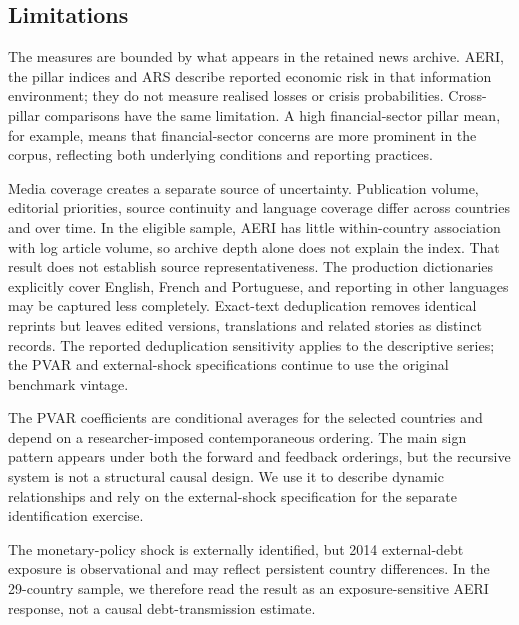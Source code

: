 \documentclass[12pt]{article}
\begin{document}
\subsection{Limitations}\label{sec:limitations}
The measures are bounded by what appears in the retained news archive. AERI, the pillar indices and ARS describe reported economic risk in that information environment; they do not measure realised losses or crisis probabilities. Cross-pillar comparisons have the same limitation. A high financial-sector pillar mean, for example, means that financial-sector concerns are more prominent in the corpus, reflecting both underlying conditions and reporting practices.

Media coverage creates a separate source of uncertainty. Publication volume, editorial priorities, source continuity and language coverage differ across countries and over time. In the eligible sample, AERI has little within-country association with log article volume, so archive depth alone does not explain the index. That result does not establish source representativeness. The production dictionaries explicitly cover English, French and Portuguese, and reporting in other languages may be captured less completely. Exact-text deduplication removes identical reprints but leaves edited versions, translations and related stories as distinct records. The reported deduplication sensitivity applies to the descriptive series; the PVAR and external-shock specifications continue to use the original benchmark vintage.

The PVAR coefficients are conditional averages for the selected countries and depend on a researcher-imposed contemporaneous ordering. The main sign pattern appears under both the forward and feedback orderings, but the recursive system is not a structural causal design. We use it to describe dynamic relationships and rely on the external-shock specification for the separate identification exercise.

The monetary-policy shock is externally identified, but 2014 external-debt exposure is observational and may reflect persistent country differences. In the 29-country sample, we therefore read the result as an exposure-sensitive AERI response, not a causal debt-transmission estimate.
\printbibliography[title={References}]
\end{document}
